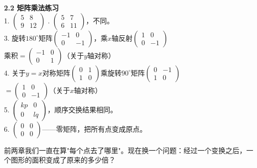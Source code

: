 \documentclass[a4paper,12pt]{ctexart}
\begin{document}
\noindent\textbf{2.2 矩阵乘法练习}\\
1. $\begin{pmatrix}5&8\\9&12\end{pmatrix}$ . $\begin{pmatrix}5&7\\6&11\end{pmatrix}$，不同。\\
3. 旋转$180^\circ$矩阵$\begin{pmatrix}-1&0\\0&-1\end{pmatrix}$，乘$x$轴反射$\begin{pmatrix}1&0\\0&-1\end{pmatrix}$\\
乘积$=\begin{pmatrix}-1&0\\0&1\end{pmatrix}$（关于$y$轴对称）\\
4. 关于$y=x$对称矩阵$\begin{pmatrix}0&1\\1&0\end{pmatrix}$乘旋转$90^\circ$矩阵$\begin{pmatrix}0&-1\\1&0\end{pmatrix}$\\
$=\begin{pmatrix}1&0\\0&-1\end{pmatrix}$（关于$x$轴对称）\\
5. $\begin{pmatrix}kp&0\\0&lq\end{pmatrix}$，顺序交换结果相同。\\
6. $\begin{pmatrix}0&0\\0&0\end{pmatrix}$——零矩阵，把所有点变成原点。

\newpage



前两章我们一直在算"每个点去了哪里"。现在换一个问题：经过一个变换之后，一个图形的面积变成了原来的多少倍？
\end{document}
